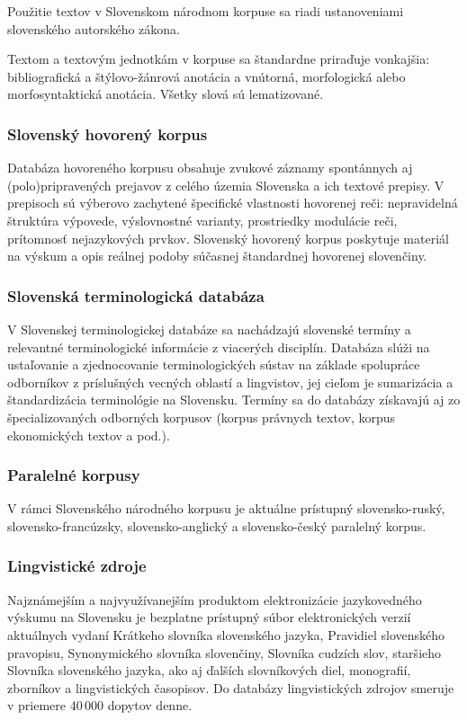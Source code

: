 \begin{multicols}{2}
Použitie textov v Slovenskom národnom korpuse sa riadi ustanoveniami
slovenského autorského zákona. 

Textom a textovým jednotkám v korpuse sa štandardne priraďuje
vonkajšia: bibliografická a štýlovo-žánrová
anotácia\cite{f12} a vnútorná,
morfologická alebo morfosyntaktická
anotácia\cite{f13}. Všetky slová
sú lematizované. 

\subsubsection{Slovenský hovorený korpus}
Databáza hovoreného korpusu\cite{f14} obsahuje zvukové záznamy
spontánnych aj (polo)pripravených prejavov z celého územia
Slovenska a ich textové prepisy. V prepisoch sú výberovo zachytené
špecifické vlastnosti hovorenej reči: nepravidelná štruktúra
výpovede, výslovnostné varianty, prostriedky modulácie reči,
prítomnosť nejazykových prvkov. Slovenský hovorený korpus poskytuje
materiál na výskum a opis reálnej podoby súčasnej štandardnej
hovorenej slovenčiny.

\subsubsection{Slovenská terminologická databáza}
V Slovenskej terminologickej
databáze\cite{f15} sa nachádzajú
slovenské termíny a relevantné terminologické informácie z
viacerých disciplín. Databáza slúži na ustaľovanie a zjednocovanie
terminologických sústav na základe spolupráce odborníkov
z príslušných vecných oblastí a lingvistov, jej cieľom je
sumarizácia a štandardizácia terminológie na Slovensku. Termíny sa
do databázy získavajú aj zo špecializovaných odborných korpusov
(korpus právnych textov, korpus ekonomických textov a pod.).

\subsubsection{Paralelné korpusy}
V rámci Slovenského národného korpusu je aktuálne
prístupný
slovensko-ruský\cite{f16}, slovensko-francúzsky\cite{f17},
slovensko-anglický\cite{f18} a
slovensko-český\cite{f19} paralelný
korpus.

\subsubsection{Lingvistické zdroje}
Najznámejším a najvyužívanejším produktom
elektronizácie jazykovedného výskumu na Slovensku je bezplatne
prístupný súbor elektronických verzií aktuálnych vydaní Krátkeho
slovníka slovenského jazyka, Pravidiel slovenského pravopisu,
Synonymického slovníka slovenčiny, Slovníka cudzích slov,
staršieho Slovníka slovenského
jazyka\cite{f20}, ako aj ďalších
slovníkových diel, monografií, zborníkov a lingvistických
časopisov\cite{f21}. Do databázy
lingvistických zdrojov smeruje v priemere 40\,000 dopytov denne.

\end{multicols}

